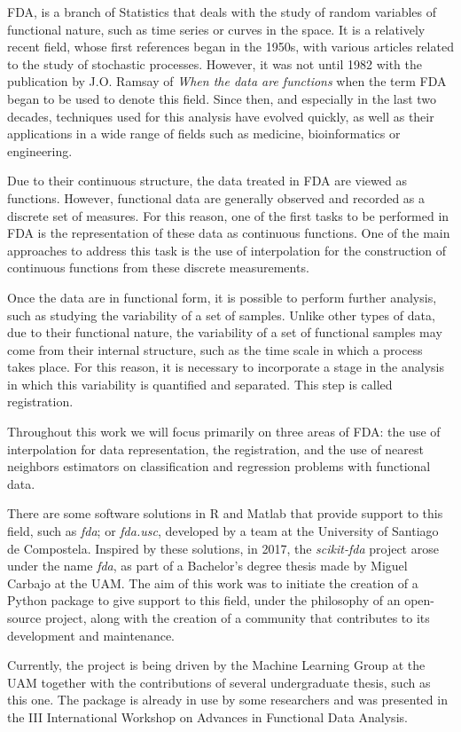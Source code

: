 
\ac{FDA}, is a branch of
Statistics that deals with the study of random variables of
functional nature, such as time series or curves in the
space. It is a relatively recent field, whose first references
began in the 1950s, with various articles related to the study of stochastic
processes. However, it was not until 1982 with the publication by
J.O. Ramsay of \textit{When the data are functions}\cite{Ramsay1982} when the
term \acs{FDA} began to be used to denote this field.
Since then, and especially in the last two decades, techniques used for this analysis
have evolved quickly, as well as their applications in a wide range of fields
such as medicine, bioinformatics or engineering.

Due to their continuous structure, the data treated in FDA are viewed as functions.
However, functional data are generally observed and recorded as a discrete set of
measures. For this reason, one of the first tasks to be performed in FDA is the
representation of these data as continuous functions.
One of the main approaches to address this task is the use of interpolation
for the construction of continuous functions from these discrete measurements.

Once the data are in functional form, it is possible to perform
further analysis, such as studying the variability of a set of samples.
Unlike other types of data, due to their functional nature, the variability of
a set of functional samples may come from their internal structure, such as the time scale
in which a process takes place. For this reason, it is necessary to
incorporate a stage in the analysis in which this variability is quantified
and separated. This step is called registration.

Throughout this work we will focus primarily on three areas of FDA:
the use of interpolation for data representation, the registration, and the use
of nearest neighbors estimators on classification and regression problems with
functional data.

There are some software solutions in R and Matlab that provide support to this
field, such as \textit{fda}\cite{fda-r}\cite{Ramsay2009};
or \textit{fda.usc}\cite{FdaUsc}, developed by a team at the
University of Santiago de Compostela.
Inspired by these solutions, in 2017, the \textit{scikit-fda} project arose
under the name \textit{fda}\cite{FDA2018}, as part of a Bachelor's degree thesis
made by Miguel Carbajo at the UAM. The aim of this work was to initiate the creation of a
Python package to give support to this field, under the philosophy of an open-source
project, along with the creation of a community that contributes to its development
and maintenance.

Currently, the project is being driven by the Machine
Learning Group at the UAM together with the contributions of several
undergraduate thesis, such as this one.
The package is already in use by some researchers and was presented
in the III International Workshop on Advances in Functional Data
Analysis\cite{workshop}.
